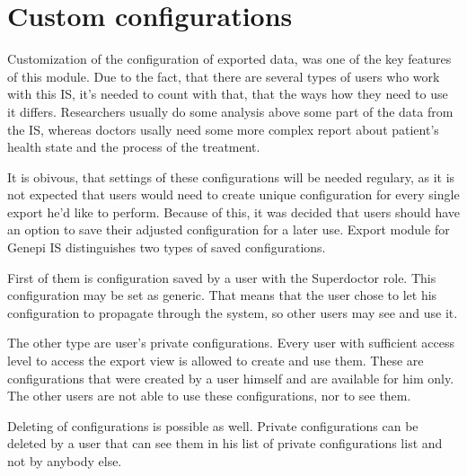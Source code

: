 \documentclass[thesis=B,english]{FITthesis}[2012/10/20]
\begin{document}
\section{Custom configurations}
Customization of the configuration of exported data, was one of the key features of this module. Due to the fact, that there are several types of users who work with this IS, it's needed to count with that, that the ways how they need to use it differs. Researchers usually do some analysis above some part of the data from the IS, whereas doctors usally need some more complex report about patient's health state and the process of the treatment.

It is obivous, that settings of these configurations will be needed regulary, as it is not expected that users would need to create unique configuration for every single export he'd like to perform. Because of this, it was decided that users should have an option to save their adjusted configuration for a later use. Export module for Genepi IS distinguishes two types of saved configurations.

First of them is configuration saved by a user with the Superdoctor role. This configuration may be set as generic. That means that the user chose to let his configuration to propagate through the system, so other users may see and use it.

The other type are user's private configurations. Every user with sufficient access level to access the export view is allowed to create and use them. These are configurations that were created by a user himself and are available for him only. The other users are not able to use these configurations, nor to see them.

Deleting of configurations is possible as well. Private configurations can be deleted by a user that can see them in his list of private configurations list and not by anybody else. 
\end{document}

